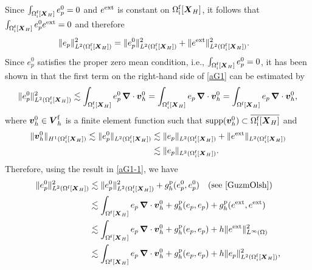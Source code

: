 \documentclass[11pt,reqno]{amsart}
\theoremstyle{definition}
\theoremstyle{plain}
\numberwithin{theorem}{section}
\numberwithin{proposition}{section}
\numberwithin{lemma}{section}
\numberwithin{equation}{section}
\newcommand{\bs}[1]{\boldsymbol{#1}}
\newcommand{\uu}[1]  {{\bs{#1}} }
\newcommand{\grad}   { \uu{\nabla}    }
\newcommand{\bv}{{\bs v}}
\newcommand{\bV}{{\bs V}}
\renewcommand{\(}{\bigl(}
\renewcommand{\)}{\bigr)}
\begin{document}
Since $\int_{\Omega^{\rm f}_{\rm i}[{\bs X}_H]}e_p^0=0$ and $e^{\rm ext}$ is constant on $\Omega^{\rm f}_{\rm i}[{\bs X}_H]$, it follows that $\int_{\Omega^{\rm f}_{\rm i}[{\bs X}_H]} e_p^0e^{\rm ext} = 0$ and therefore 
\begin{equation}\label{aG1}
\begin{split}
\|e_p\|^2_{L^2(\Omega^{\rm f}_i[{\bs X}_H])} &= \|e_p^0\|^2_{L^2(\Omega^{\rm f}_i[{\bs X}_H])} 
+ \|e^{\rm ext}\|_{L^2(\Omega^{\rm f}_i[{\bs X}_H])}^2 .
\end{split}
\end{equation}
Since $e_p^0$ satisfies the proper zero mean condition, i.e., $\int_{\Omega^{\rm f}_{\rm i}[{\bs X}_H]}e_p^0=0$, it has been shown in \cite[Lemma 4 and Section 6]{GuzmOlsh} that the first term on the right-hand side of \eqref{aG1} can be estimated by 
\begin{equation}\label{aG1-1}
\|e_p^0\|^2_{L^2(\Omega^{\rm f}_i[{\bs X}_H])}  
\lesssim \int_{\Omega^{\rm f}_i[{\bs X}_H]} e_p^0 \,\grad\cdot {\bs v}_h^0
= \int_{\Omega^{\rm f}_i[{\bs X}_H]} e_p \,\grad\cdot {\bs v}_h^0
= \int_{\Omega^{\rm f}[{\bs X}_H]} e_p \,\grad\cdot {\bs v}_h^0 ,
\end{equation}
where $\bv_h^0\in\bV_h^{\rm f}$ is a finite element function such that $\text{supp}(\bv_h^0)\subset \overline{\Omega^{\rm f}_{\rm i}[{\bs X}_H]}$ and 
\begin{align}
\|\bv_h^0\|_{H^1(\Omega^{\rm f}_i[{\bs X}_H])}
\lesssim \|e_p^0\|_{L^2(\Omega^{\rm f}_i[{\bs X}_H])} 
&\lesssim \|e_p\|_{L^2(\Omega^{\rm f}_i[{\bs X}_H])} + \|e^{\rm ext}\|_{L^2(\Omega^{\rm f}_i[{\bs X}_H])} \notag\\
&\lesssim \|e_p\|_{L^2(\Omega^{\rm f}_i[{\bs X}_H])} . 
\end{align}
Therefore, using the result in \eqref{aG1-1}, we have 
\begin{align}\label{aG1-2}
\|e_p^0\|^2_{L^2(\Omega^{\rm f}[{\bs X}_H])}  
&\lesssim 
\|e_p^0\|^2_{L^2(\Omega^{\rm f}_i[{\bs X}_H])}  
+ g_h^{\rm p}(e_p^0,e_p^0)
\quad\mbox{(see \cite[inequality (4.2)]{GuzmOlsh})}\notag\\
&\lesssim 
\int_{\Omega^{\rm f}[{\bs X}_H]} e_p \,\grad\cdot {\bs v}_h^0
+ g_h^{\rm p}(e_p,e_p) + g_h^{\rm p}(e^{\rm ext},e^{\rm ext})\notag\\
&\lesssim 
\int_{\Omega^{\rm f}[{\bs X}_H]} e_p \,\grad\cdot {\bs v}_h^0
+ g_h^{\rm p}(e_p,e_p) + h \|e^{\rm ext}\|_{L^\infty(\Omega)}^2 \notag\\
&\lesssim 
\int_{\Omega^{\rm f}[{\bs X}_H]} e_p \,\grad\cdot {\bs v}_h^0
+ g_h^{\rm p}(e_p,e_p) + h \|e_p\|_{L^2(\Omega^{\rm f}_i[{\bs X}_H])}^2 , 
\end{align}
\end{document}
